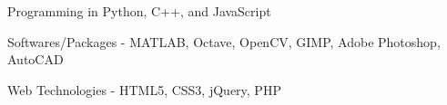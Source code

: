 \begin{cventries}
  \cventryskills
    {
      \begin{cvitems}
        \item {Programming in Python, C++, and JavaScript}
        \item {Softwares/Packages - MATLAB, Octave, OpenCV, GIMP, Adobe Photoshop, AutoCAD}
        \item {Web Technologies - HTML5, CSS3, jQuery,  PHP}
      \end{cvitems}
    }
\end{cventries}